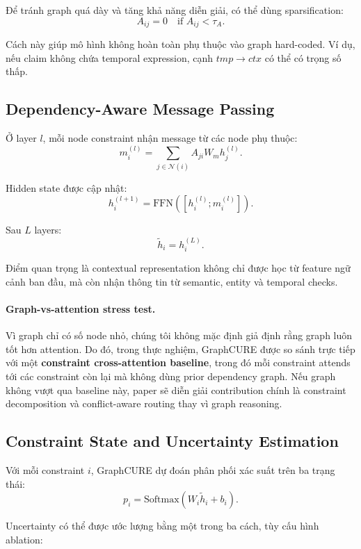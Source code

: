 \documentclass[11pt,a4paper]{article}
\begin{document}
Để tránh graph quá dày và tăng khả năng diễn giải, có thể dùng sparsification:
\[
A_{ij}=0 \quad \text{if } A_{ij} < \tau_A.
\]

Cách này giúp mô hình không hoàn toàn phụ thuộc vào graph hard-coded. Ví dụ, nếu claim không chứa temporal expression, cạnh $tmp \rightarrow ctx$ có thể có trọng số thấp.

\subsection{Dependency-Aware Message Passing}

Ở layer $l$, mỗi node constraint nhận message từ các node phụ thuộc:
\[
m_i^{(l)} = \sum_{j\in \mathcal{N}(i)} A_{ji} W_m h_j^{(l)}.
\]

Hidden state được cập nhật:
\[
h_i^{(l+1)} = \text{FFN}\left([h_i^{(l)};m_i^{(l)}]\right).
\]

Sau $L$ layers:
\[
\tilde{h}_i = h_i^{(L)}.
\]

Điểm quan trọng là contextual representation không chỉ được học từ feature ngữ cảnh ban đầu, mà còn nhận thông tin từ semantic, entity và temporal checks.

\paragraph{Graph-vs-attention stress test.}
Vì graph chỉ có số node nhỏ, chúng tôi không mặc định giả định rằng graph luôn tốt hơn attention. Do đó, trong thực nghiệm, GraphCURE được so sánh trực tiếp với một \textbf{constraint cross-attention baseline}, trong đó mỗi constraint attends tới các constraint còn lại mà không dùng prior dependency graph. Nếu graph không vượt qua baseline này, paper sẽ diễn giải contribution chính là constraint decomposition và conflict-aware routing thay vì graph reasoning.

\subsection{Constraint State and Uncertainty Estimation}

Với mỗi constraint $i$, GraphCURE dự đoán phân phối xác suất trên ba trạng thái:
\[
p_i = \text{Softmax}(W_i\tilde{h}_i+b_i).
\]

Uncertainty có thể được ước lượng bằng một trong ba cách, tùy cấu hình ablation:
\end{document}
